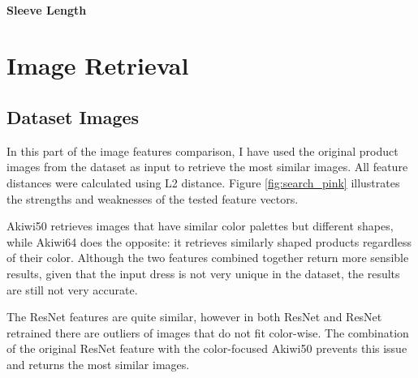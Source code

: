 \documentclass[12pt]{report}
\begin{document}
\paragraph{Sleeve Length}


\pagebreak
\section{Image Retrieval}

\subsection{Dataset Images}
In this part of the image features comparison, I have used the original product images from the dataset as input to retrieve the most similar images. All feature distances were calculated using L2 distance. Figure \ref{fig:search_pink} illustrates the strengths and weaknesses of the tested feature vectors. 

Akiwi50 retrieves images that have similar color palettes but different shapes, while Akiwi64 does the opposite: it retrieves similarly shaped products regardless of their color. Although the two features combined together return more sensible results, given that the input dress is not very unique in the dataset, the results are still not very accurate. 

The ResNet features are quite similar, however in both ResNet and ResNet retrained there are outliers of images that do not fit color-wise. The combination of the original ResNet feature with the color-focused Akiwi50 prevents this issue and returns the most similar images. 
\end{document}
